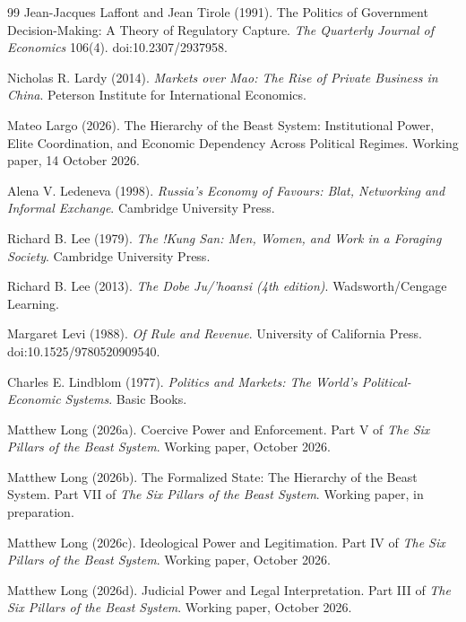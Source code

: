 \documentclass[11pt,letterpaper]{article}
\theoremstyle{definition}
\theoremstyle{remark}
\begin{document}
\begin{thebibliography}{99}
Jean-Jacques Laffont and Jean Tirole (1991). The Politics of Government Decision-Making: A Theory of Regulatory Capture. \emph{The Quarterly Journal of Economics} 106(4). doi:10.2307/2937958.

Nicholas R. Lardy (2014). \emph{Markets over Mao: The Rise of Private Business in China}. Peterson Institute for International Economics.

Mateo Largo (2026). The Hierarchy of the Beast System: Institutional Power, Elite Coordination, and Economic Dependency Across Political Regimes. Working paper, 14 October 2026.

Alena V. Ledeneva (1998). \emph{Russia's Economy of Favours: Blat, Networking and Informal Exchange}. Cambridge University Press.

Richard B. Lee (1979). \emph{The !Kung San: Men, Women, and Work in a Foraging Society}. Cambridge University Press.

Richard B. Lee (2013). \emph{The Dobe Ju/'hoansi (4th edition)}. Wadsworth/Cengage Learning.

Margaret Levi (1988). \emph{Of Rule and Revenue}. University of California Press. doi:10.1525/9780520909540.

Charles E. Lindblom (1977). \emph{Politics and Markets: The World's Political-Economic Systems}. Basic Books.

Matthew Long (2026a). Coercive Power and Enforcement. Part V of \emph{The Six Pillars of the Beast System}. Working paper, October 2026.

Matthew Long (2026b). The Formalized State: The Hierarchy of the Beast System. Part VII of \emph{The Six Pillars of the Beast System}. Working paper, in preparation.

Matthew Long (2026c). Ideological Power and Legitimation. Part IV of \emph{The Six Pillars of the Beast System}. Working paper, October 2026.

Matthew Long (2026d). Judicial Power and Legal Interpretation. Part III of \emph{The Six Pillars of the Beast System}. Working paper, October 2026.


\end{thebibliography}
\end{document}
